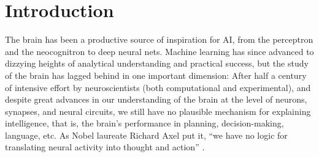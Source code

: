 \documentclass[final,12pt]{colt2022} %
\begin{document}
\section{Introduction}

The brain has been a productive source of inspiration for AI, from the perceptron and the neocognitron to deep neural nets. Machine learning has since advanced to dizzying heights of analytical understanding and practical success, but the study of the brain has lagged behind in one important dimension: After half a century of intensive effort by neuroscientists (both computational and experimental), and despite great advances in our understanding of the brain at the level of neurons, synapses, and neural circuits, we still have no plausible mechanism for explaining intelligence, that is, the brain's performance in planning, decision-making, language, etc. As Nobel laureate Richard Axel put it, ``we have no logic for translating neural activity into thought and action'' \citep{AxelNeuron2018}.
\end{document}
